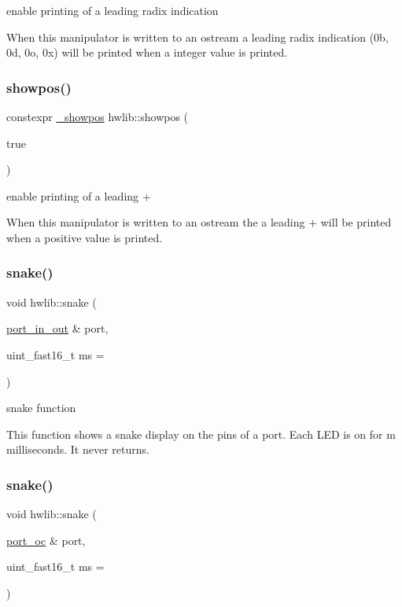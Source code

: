 enable printing of a leading radix indication

When this manipulator is written to an ostream a leading radix indication (0b, 0d, 0o, 0x) will be printed when a integer value is printed. \mbox{\label{namespacehwlib_a7bb9927f52011b4cc4a90b03e98f95fd}} 
\subsubsection{\texorpdfstring{showpos()}{showpos()}}
{\footnotesize\ttfamily constexpr \hyperlink{structhwlib_1_1__showpos}{\+\_\+showpos} hwlib\+::showpos (\begin{DoxyParamCaption}\item[{true}]{ }\end{DoxyParamCaption})}

enable printing of a leading \textquotesingle{}+\textquotesingle{}

When this manipulator is written to an ostream the a leading \textquotesingle{}+\textquotesingle{} will be printed when a positive value is printed. \mbox{\label{namespacehwlib_afec6df9d280b36f3c7f43ffb607edd92}} 
\subsubsection{\texorpdfstring{snake()}{snake()}\hspace{0.1cm}{\footnotesize\ttfamily [1/3]}}
{\footnotesize\ttfamily void hwlib\+::snake (\begin{DoxyParamCaption}\item[{\hyperlink{classhwlib_1_1port__in__out}{port\+\_\+in\+\_\+out} \&}]{port,  }\item[{uint\+\_\+fast16\+\_\+t}]{ms = {} }\end{DoxyParamCaption})}

snake function

This function shows a snake display on the pins of a port. Each L\+ED is on for m milliseconds. It never returns. \mbox{\label{namespacehwlib_a7e2fef74b1e48c7ae225d7b2a7b2935f}} 
\subsubsection{\texorpdfstring{snake()}{snake()}\hspace{0.1cm}{\footnotesize\ttfamily [2/3]}}
{\footnotesize\ttfamily void hwlib\+::snake (\begin{DoxyParamCaption}\item[{\hyperlink{classhwlib_1_1port__oc}{port\+\_\+oc} \&}]{port,  }\item[{uint\+\_\+fast16\+\_\+t}]{ms = {} }\end{DoxyParamCaption})}



